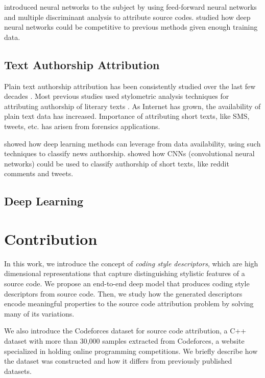  introduced neural networks to the subject by using feed-forward neural networks and multiple discriminant analysis to attribute source codes.  studied how deep neural networks could be competitive to previous methods given enough training data.

\subsection{Text Authorship Attribution}

Plain text authorship attribution has been consistently studied over the last few decades \cite{survey_text_recognition}. Most previous studies used stylometric analysis techniques for attributing authorship of literary texts \cite{stylometric,text_recognition}. As Internet has grown, the availability of plain text data has increased. Importance of attributing short texts, like SMS, tweets, etc. has arisen from forensics applications. 

 showed how deep learning methods can leverage from data availability, using such techniques to classify news authorship.  showed how CNNs (convolutional neural networks) could be used to classify authorship of short texts, like reddit comments and tweets.

\subsection{Deep Learning}


\section{Contribution}

In this work, we introduce the concept of \textit{coding style descriptors}, which are high dimensional representations that capture distinguishing stylistic features of a source code. We propose an end-to-end deep model that produces coding style descriptors from source code. Then, we study how the generated descriptors encode meaningful properties to the source code attribution problem by solving many of its variations.

We also introduce the Codeforces dataset for source code attribution, a C++ dataset with more than 30,000 samples extracted from Codeforces, a website specialized in holding online programming competitions. We briefly describe how the dataset was constructed and how it differs from previously published datasets.